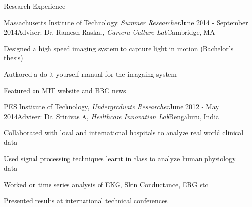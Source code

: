 \documentclass{resume}
\begin{document}
\begin{rSection}{Research Experience}
    \begin{rSubsection}{Massachusetts Institute of Technology, \textit{Summer Researcher}}{June 2014 - September 2014}{Adviser: Dr. Ramesh Raskar, \textit{Camera Culture Lab}}{Cambridge, MA}
\item Designed a high speed imaging system to capture light in motion (Bachelor's thesis)
\item Authored a do it yourself manual for the imagaing system
\item Featured on MIT website and BBC news
    \end{rSubsection}
    
 \begin{rSubsection}{PES Institute of Technology, \textit{Undergraduate Researcher}}{June 2012 - May 2014}{Adviser: Dr. Srinivas A, \textit{Healthcare Innovation Lab}}{Bengaluru, India}
\item Collaborated with local and international hospitals to analyze real world clinical data
\item Used signal processing techniques learnt in class to analyze human physiology data
\item Worked on time series analysis of EKG, Skin Conductance, ERG etc
\item Presented results at international technical conferences
 \end{rSubsection}
  \end{rSection}

\vspace{1em} 
\end{document}
